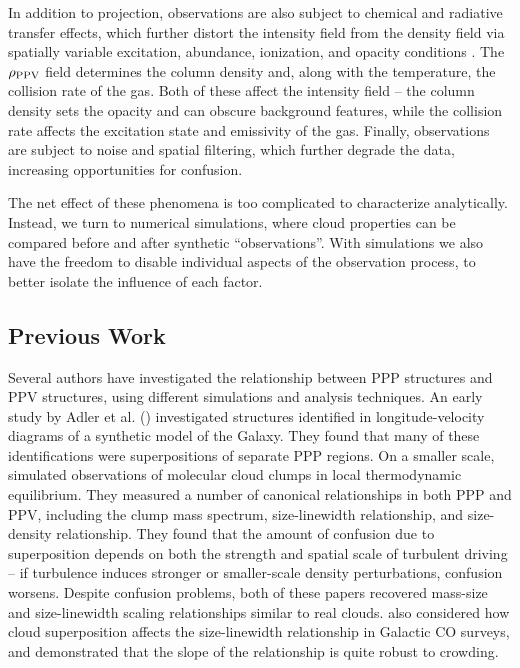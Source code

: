 In addition to projection, observations are also subject to chemical and radiative transfer
effects, which further distort the intensity field from the density
field via spatially variable excitation, abundance, ionization, and
opacity conditions \citep{http://adsabs.harvard.edu/abs/2006MNRAS.371.1865B, Lee13, http://adsabs.harvard.edu/abs/2008ApJ...679..481P}. The $\rho_{\rm PPV}$ field determines the column density and, along with the temperature, the collision rate of the gas. Both of these affect the intensity field -- the column density sets the opacity and can obscure background features, while the collision rate affects the excitation state and emissivity of the gas. Finally, observations are
subject to noise and spatial filtering, which
further degrade the data, increasing opportunities for confusion.

The net effect of these phenomena is too complicated to characterize
analytically. Instead, we turn to numerical simulations, where cloud
properties can be compared before and after synthetic ``observations''. With
simulations we also have the freedom to disable individual aspects of the
observation process, to better isolate the influence of each factor.

\subsection{Previous Work}

Several authors have investigated the relationship between PPP structures and PPV structures, using different simulations and analysis techniques. An early study by
Adler et al. (\citeyear{http://adsabs.harvard.edu/abs/1992ApJ...384...95A}) investigated structures identified in longitude-velocity diagrams of a synthetic model of the Galaxy. They found that many of these identifications were superpositions of separate PPP regions. On a smaller scale, \cite{http://adsabs.harvard.edu/abs/2002ApJ...570..734B} simulated observations of molecular cloud clumps in local thermodynamic equilibrium. They measured a number of canonical relationships
in both PPP and PPV, including the clump mass spectrum, size-linewidth relationship, and size-density relationship. They found that the
amount of confusion due to superposition depends on both the strength and spatial scale of turbulent driving -- if turbulence induces stronger or smaller-scale density perturbations, confusion worsens. Despite confusion problems, both of these papers recovered mass-size and size-linewidth scaling relationships similar to real clouds. \cite{http://adsabs.harvard.edu/abs/1990ApJ...352..132I} also considered how cloud superposition affects the size-linewidth relationship in Galactic CO surveys, and demonstrated that the slope of the relationship is quite robust to crowding.

